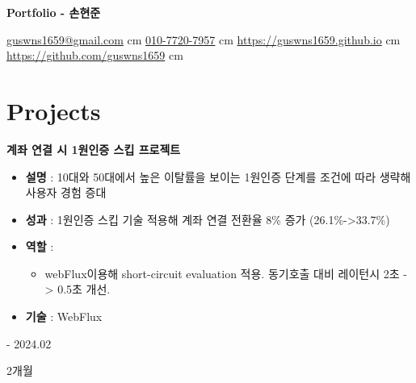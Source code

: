 \documentclass[10pt, letterpaper]{article}
\newenvironment{highlights}{
    \begin{itemize}[
        topsep=0.10 cm,
        parsep=0.10 cm,
        partopsep=0pt,
        itemsep=0pt,
        leftmargin=0.4 cm + 10pt
    ]
    }{
    \end{itemize}
} %
\newenvironment{twocolentry}[2][]{
    \onecolentry
    \def\secondColumn{#2}
    \setcolumnwidth{\fill, 4.5 cm}
    \begin{paracol}{2}
    }{
        \switchcolumn \raggedleft \secondColumn
    \end{paracol}
    \endonecolentry
} %
\newenvironment{header}{
    \setlength{\topsep}{0pt}\par\kern\topsep\centering\color{primaryColor}\linespread{1.5}
    }{
    \par\kern\topsep
} %
\let\hrefWithoutArrow\href
\renewcommand{\href}[2]{\hrefWithoutArrow{#1}{\mbox{\ifthenelse{\equal{#2}{}}{ }{#2 }\raisebox{.15ex}{\footnotesize \faExternalLink*}}}}
\begin{document}
    \placelastupdatedtext
    \begin{header}
        \fontsize{15 pt}{15 pt}
        \textbf{Portfolio - 손현준}

        \vspace{0.3 cm}

        \normalsize
        \mbox{\hrefWithoutArrow{mailto:guswns1659@gmail.com}{{\footnotesize\faEnvelope[regular]}\hspace*{0.13cm}guswns1659@gmail.com}}
         cm
        \mbox{\hrefWithoutArrow{tel:010-7720-7957}{{\footnotesize\faPhone*}\hspace*{0.13cm}010-7720-7957}}
         cm
        \mbox{\hrefWithoutArrow{https://guswns1659.github.io}{{\footnotesize\faLink}\hspace*{0.13cm}https://guswns1659.github.io}}
         cm
        \mbox{\hrefWithoutArrow{https://github.com/guswns1659}{{\footnotesize\faGithub}\hspace*{0.13cm}https://github.com/guswns1659}}
         cm
    \end{header}

    \vspace{0.3 cm - 0.3 cm}


    \section{Projects}

    \begin{twocolentry}{
        2023.12 - 2024.02

        2개월
    }
        \textbf{계좌 연결 시 1원인증 스킵 프로젝트}
        \begin{highlights}

            \item \textbf{설명} : 10대와 50대에서 높은 이탈률을 보이는 1원인증 단계를 조건에 따라 생략해 사용자 경험 증대
            \item \textbf{성과} : 1원인증 스킵 기술 적용해 계좌 연결 전환율 8\% 증가 (26.1\%->33.7\%)
            \item \textbf{역할} :
            \begin{highlights}
                \item webFlux이용해 short-circuit evaluation 적용. 동기호출 대비 레이턴시 2초 -> 0.5초 개선.
            \end{highlights}
            \item \textbf{기술} : WebFlux
        \end{highlights}
    \end{twocolentry}
\end{document}
